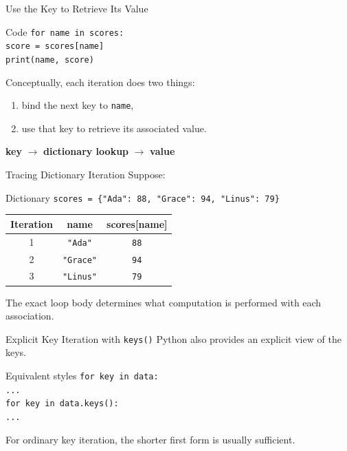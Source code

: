 \documentclass[aspectratio=169,10pt]{beamer}
\begin{document}
\begin{frame}{Use the Key to Retrieve Its Value}
  \begin{block}{Code}
    \texttt{for name in scores:}\\
    \hspace{0.20in}\texttt{score = scores[name]}\\
    \hspace{0.20in}\texttt{print(name, score)}
  \end{block}

  Conceptually, each iteration does two things:

  \begin{enumerate}
    \item bind the next key to \texttt{name},
    \item use that key to retrieve its associated value.
  \end{enumerate}

  \begin{center}
    \textbf{key} $\longrightarrow$ \textbf{dictionary lookup} $\longrightarrow$ \textbf{value}
  \end{center}
\end{frame}

\begin{frame}{Tracing Dictionary Iteration}
  Suppose:

  \begin{block}{Dictionary}
    \texttt{scores = \{"Ada": 88, "Grace": 94, "Linus": 79\}}
  \end{block}

  \begin{center}
    \renewcommand{\arraystretch}{1.25}
    \begin{tabular}{c|c|c}
      \textbf{Iteration} & \textbf{name} & \textbf{scores[name]} \\\hline
      1 & \texttt{"Ada"} & \texttt{88} \\
      2 & \texttt{"Grace"} & \texttt{94} \\
      3 & \texttt{"Linus"} & \texttt{79}
    \end{tabular}
  \end{center}

  The exact loop body determines what computation is performed with each association.
\end{frame}

\begin{frame}{Explicit Key Iteration with \texttt{keys()}}
  Python also provides an explicit view of the keys.

  \begin{block}{Equivalent styles}
    \texttt{for key in data:}\\
    \hspace{0.20in}\texttt{...}\\[0.12in]
    \texttt{for key in data.keys():}\\
    \hspace{0.20in}\texttt{...}
  \end{block}

  For ordinary key iteration, the shorter first form is usually sufficient.
\end{frame}
\end{document}
